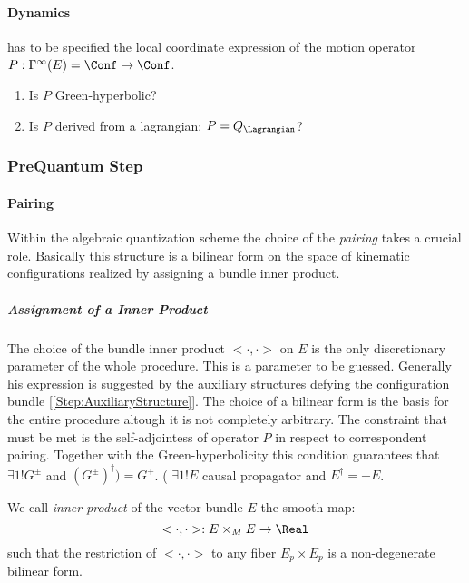 \documentclass[Main]{subfiles}
\begin{document}
   		\paragraph{Dynamics}
   		has to be specified the local coordinate expression of the motion operator $P: \Gamma^\infty (E)= \Conf \rightarrow \Conf$.
   				   	\begin{enumerate}
   						\item Is $P$ Green-hyperbolic?
   						\item Is $P$ derived from a lagrangian: $P=Q_\Lagrangian$? 
   					\end{enumerate}
   					
	\subsubsection{PreQuantum Step}%
		\paragraph{Pairing}
				Within the algebraic quantization scheme the choice of the \emph{pairing} takes a crucial role.
				Basically this structure is a bilinear form on the space of kinematic configurations realized by assigning a bundle inner product.

			\subparagraph{Assignment of a Inner Product}
				The choice of the bundle inner product  $<\cdot,\cdot>$ on $E$ is the only discretionary parameter of the whole procedure.
				This is a parameter to be guessed. Generally his expression is suggested by the auxiliary structures defying the configuration bundle [\ref{Step:AuxiliaryStructure}].
				The choice of a bilinear form is the basis for the entire procedure altough it is not completely arbitrary.
				The constraint that must be met is the self-adjointess of operator $P$ in respect to correspondent pairing.
				Together with the Green-hyperbolicity this condition guarantees that $\exists 1! G^\pm$ and $(G^\pm)^\dagger) = G^\mp$.
				( $\exists 1! E$ causal propagator and $E^\dagger =  -E$.
			\begin{definition}
				We call \emph{inner product} of the vector bundle $E$ the smooth map:
				\begin{displaymath}
					<\cdot,\cdot> : E \times_M E \rightarrow \Real
				\end{displaymath}
				such that the restriction of $<\cdot,\cdot>$ to any fiber $E_p\times E_p$ is a non-degenerate bilinear form.
			\end{definition}
\end{document}
